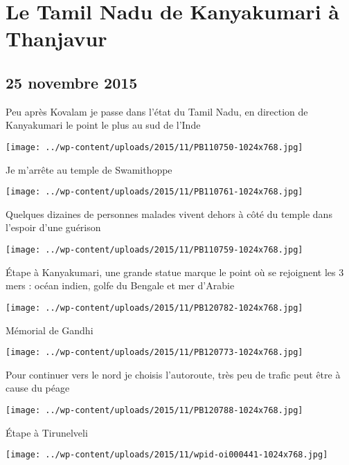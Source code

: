 \chapter{Le Tamil Nadu de Kanyakumari à Thanjavur}
\section*{25 novembre 2015}
Peu après Kovalam je passe dans l'état du Tamil Nadu, en direction de Kanyakumari le point le plus au sud de l'Inde \newline
 \newline
\centerline{\texttt{[image: ../wp-content/uploads/2015/11/PB110750-1024x768.jpg]} } 
 \newline
 Je m'arrête au temple de Swamithoppe \newline
 \newline
\centerline{\texttt{[image: ../wp-content/uploads/2015/11/PB110761-1024x768.jpg]} } 
 \newline
 Quelques dizaines de personnes malades vivent dehors à côté du temple dans l'espoir d'une guérison \newline
 \newline
\centerline{\texttt{[image: ../wp-content/uploads/2015/11/PB110759-1024x768.jpg]} } 
 \newline
 Étape à Kanyakumari, une grande statue marque le point où se rejoignent les 3 mers : océan indien, golfe du Bengale et mer d'Arabie \newline
 \newline
\centerline{\texttt{[image: ../wp-content/uploads/2015/11/PB120782-1024x768.jpg]} } 
 \newline
 Mémorial de Gandhi \newline
 \newline
\centerline{\texttt{[image: ../wp-content/uploads/2015/11/PB120773-1024x768.jpg]} } 
 \newline
 Pour continuer vers le nord je choisis l'autoroute, très peu de trafic peut être à cause du péage \newline
 \newline
\centerline{\texttt{[image: ../wp-content/uploads/2015/11/PB120788-1024x768.jpg]} } 
 \newline
 Étape à Tirunelveli \newline
 \newline
\centerline{\texttt{[image: ../wp-content/uploads/2015/11/wpid-oi000441-1024x768.jpg]} } 
